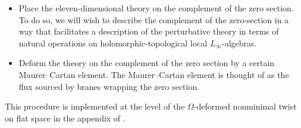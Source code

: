 \begin{itemize}
  \item Place the eleven-dimensional theory on the complement of the zero section. 
  To do so, we will wish to describe the complement of the zero-section in a way that facilitates a description of the perturbative theory in terms of natural operations on holomorphic-topological local $L_{\infty}$-algebras.

  \item Deform the theory on the complement of the zero section by a certain Maurer--Cartan element.
  The Maurer--Cartan element is thought of as the flux sourced by branes wrapping the zero section.
\end{itemize}

This procedure is implemented at the level of the $\Omega$-deformed nonminimal twist on flat space in the appendix of \cite{CostelloM5}.





